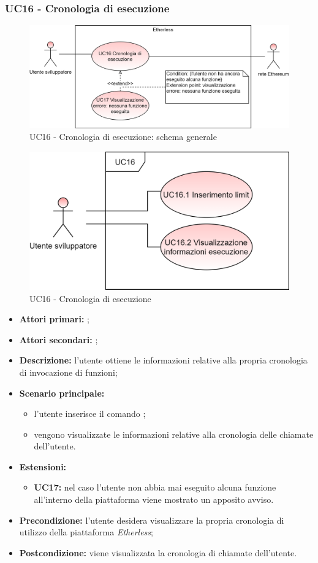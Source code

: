 \subsubsection{UC16 - Cronologia di esecuzione}
\begin{figure}[H]
	\centering
	\includegraphics[scale=\ucs]{./res/img/UC16G.png}
	\caption {UC16 - Cronologia di esecuzione: schema generale}
\end{figure}
\begin{figure}[H]
	\centering
	\includegraphics[scale=\ucs]{./res/img/UC16.png}
	\caption {UC16 - Cronologia di esecuzione}
\end{figure}
\begin{itemize}
	\item \textbf{Attori primari:} \us{};
	\item \textbf{Attori secondari:} \re{};
	\item \textbf{Descrizione:} l’utente ottiene le informazioni relative alla propria cronologia di invocazione di funzioni;
	\item \textbf{Scenario principale:} 
	\begin{itemize}
		\item l'utente inserisce il comando \history;  
		\item vengono visualizzate le informazioni relative alla cronologia delle chiamate dell’utente.
	\end{itemize}
	\item \textbf{Estensioni:} 
	\begin{itemize}
		\item \textbf{UC17:} nel caso l’utente non abbia mai eseguito alcuna funzione all’interno della piattaforma viene mostrato un apposito avviso.  
	\end{itemize}
	\item \textbf{Precondizione:} l’utente desidera visualizzare la propria cronologia di utilizzo della piattaforma \textit{Etherless}; 
	\item \textbf{Postcondizione:} viene visualizzata la cronologia di chiamate dell’utente.  
\end{itemize}